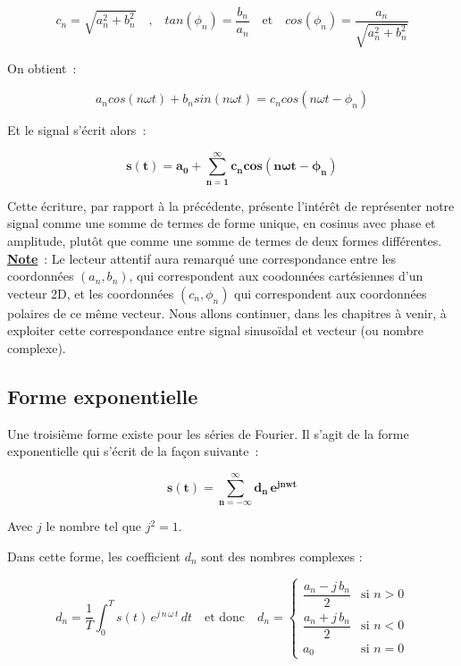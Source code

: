 $$c_n = \sqrt{a_n^2+b_n^2} \quad\text{,}\quad tan(\phi_n) = \dfrac{b_n}{a_n} \quad\text{et}\quad cos(\phi_n)= \dfrac{a_n}{\sqrt{a_n^2+b_n^2}}$$

On obtient~:

$$ a_ncos(n\omega t)+b_nsin(n\omega t) = c_n cos( n \omega t - \phi_n ) $$ 

Et le signal s'écrit alors~:

\begin{equation}
\bm{s(t)= a_0 + \sum_{n=1}^{\infty} c_n cos( n \omega t - \phi_n )} 
\end{equation}

Cette écriture, par rapport à la précédente, présente l'intérêt de représenter notre signal comme une somme de termes de forme unique, en cosinus avec phase et amplitude, plutôt que comme une somme de termes de deux formes différentes. \\

\textbf{\underline{Note}}~: Le lecteur attentif aura remarqué une correspondance entre les coordonnées $(a_n,b_n)$, qui correspondent aux coodonnées cartésiennes d'un vecteur 2D, et les coordonnées $(c_n, \phi_n)$ qui correspondent aux coordonnées polaires de ce même vecteur. Nous allons continuer, dans les chapitres à venir, à exploiter cette correspondance entre signal sinusoïdal et vecteur (ou nombre complexe).

\subsection*{Forme exponentielle}

Une troisième forme existe pour les séries de Fourier. Il s'agit de la forme exponentielle qui s'écrit de la façon suivante~:

\begin{equation}
\bm{s(t) = \sum_{n=-\infty}^{\infty} d_n\,e^{jnwt} }
\end{equation}

Avec $j$ le nombre tel que $j^2=1$.

Dans cette forme, les coefficient $d_n$ sont des nombres complexes :

$$ d_n = \dfrac{1}{T} \int_{0}^{T} s(t)\,e^{ j\,n\,\omega\,t }\,dt \quad  \text{et donc} \quad d_n = 
\begin{cases} 
	\dfrac{a_n - j\,b_n}{2} & \text{si } n>0 \\
	\dfrac{a_n + j\,b_n}{2} & \text{si } n<0 \\
	a_0 & \text{si } n=0
\end{cases}
$$  

